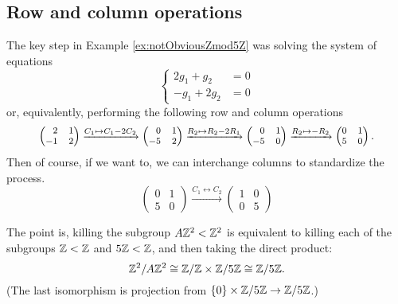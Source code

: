 \documentclass[../algebraNotesMSRI-UP2016.tex]{subfiles}
\begin{document}
\subsection[\subsecname]{Row and column operations}
\begin{frame}{\subsecname}{}
The key step in Example \ref{ex:notObviousZmod5Z} was solving the system of equations
\[
\left\{\begin{aligned}
	2g_1+g_2 &= 0 \\
	-g_1+2g_2 &= 0
	\end{aligned}
	\right.
\]
or, equivalently, performing the following row and column operations
\[\footnotesize
\begin{pmatrix*}[r]
2 & 1 \\
-1 & 2
\end{pmatrix*} \xrightarrow{C_1\mapsto C_1-2C_2}
\begin{pmatrix*}[r]
0 & 1 \\
-5 & 2 
\end{pmatrix*}   \xrightarrow{R_2\mapsto R_2-2R_1} 
\begin{pmatrix*}[r]
0 & 1 \\
-5 & 0 
\end{pmatrix*} \xrightarrow{R_2\mapsto -R_2}
\begin{pmatrix}
0 & 1 \\
5 & 0 
\end{pmatrix}.
\]
Then of course, if we want to, we can interchange columns to standardize the process.  
\[
\begin{pmatrix}
0 & 1 \\
5 & 0 
\end{pmatrix} \xrightarrow{C_1\leftrightarrow C_2}
\begin{pmatrix}
1 & 0 \\
0 & 5 
\end{pmatrix}
\]
\end{frame}

\begin{frame}[c]
The point is, killing the subgroup $A\mathbb Z^2< \mathbb Z^2$ is equivalent to killing each of the subgroups $\mathbb Z< \mathbb Z$ and $5\mathbb Z<\mathbb Z$, and then taking the direct product:
\[
\mathbb Z^2/A\mathbb Z^2 \cong \mathbb Z/\mathbb Z\times \mathbb Z/5\mathbb Z \cong \mathbb Z/5\mathbb Z. 
\]
(The last isomorphism is projection from $\{0\}\times \mathbb Z/5\mathbb Z\to \mathbb Z/5\mathbb Z$.)
\end{frame}
\end{document}

